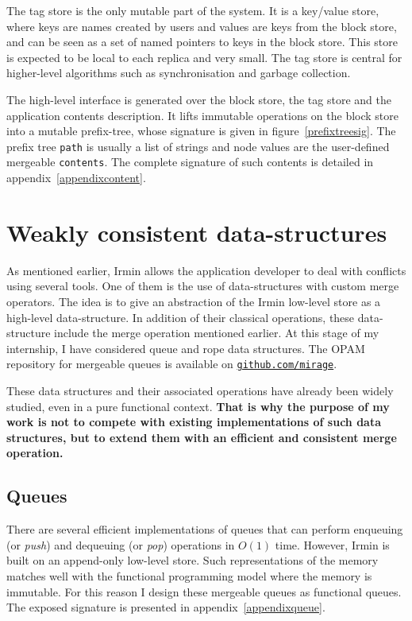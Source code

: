 \documentclass{article}
\newcommand{\irmin}{Irmin\xspace}
\newcommand{\opam}{OPAM\xspace}
\newcommand{\code}[1]{\texttt{#1}}
\begin{document}
The tag store is the only mutable part of the system.
It is a key/value store, where keys are names created by users and values are keys from the block store, and can be seen as a set of named pointers to keys in the block store.
This store is expected to be local to each replica and very small.
The tag store is central for higher-level algorithms such as synchronisation and garbage collection.

The high-level interface is generated over the block store, the tag store and the application contents description.
It lifts immutable operations on the block store into a mutable prefix-tree, whose signature is given in figure~\ref{prefixtreesig}.
The prefix tree \code{path} is usually a list of strings and node values are the user-defined mergeable \code{contents}.
The complete signature of such contents is detailed in appendix~\ref{appendixcontent}.



\section{Weakly consistent data-structures}

As mentioned earlier, \irmin allows the application developer to deal with conflicts using several tools.
One of them is the use of data-structures with custom merge operators.
The idea is to give an abstraction of the \irmin low-level store as a high-level data-structure.
In addition of their classical operations, these data-structure include the merge operation mentioned earlier. 
At this stage of my internship, I have considered queue and rope data structures.
The \opam repository for mergeable queues is available on \href{https://github.com/mirage/merge-queues}{\texttt{github.com/mirage}}.

These data structures and their associated operations have already been widely studied, even in a pure functional context\cite{PurelyFunctionalDataStructures1996}.
\textbf{That is why the purpose of my work is not to compete with existing implementations of such data structures, but to extend them with an efficient and consistent merge operation.}


\subsection{Queues}

There are several efficient implementations of queues that can perform enqueuing (or \emph{push}) and dequeuing (or \emph{pop}) operations in $O(1)$ time.
However, \irmin is built on an append-only low-level store.
Such representations of the memory matches well with the functional programming model where the memory is immutable.
For this reason I design these mergeable queues as functional queues.
The exposed signature is presented in appendix~\ref{appendixqueue}.
\end{document}
